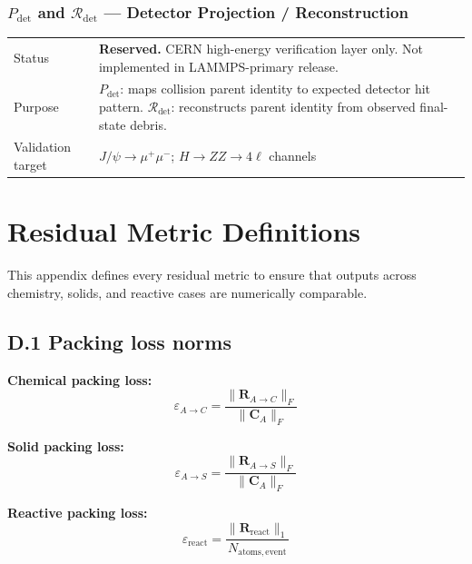 \documentclass[11pt, a4paper, oneside]{article}
\newcommand{\Comp}[1]{\mathbf{C}_{#1}}
\newcommand{\Resid}[1]{\mathbf{R}_{#1}}
\begin{document}
\begin{appendices}
\vspace{1em}

\subsubsection*{$P_{\mathrm{det}}$ and $\mathcal{R}_{\mathrm{det}}$ --- Detector Projection / Reconstruction}

\begin{tabularx}{\linewidth}{l X}
  \toprule
  Status & \textbf{Reserved.} CERN high-energy verification layer only.
	Not implemented in LAMMPS-primary release. \\
  Purpose & $P_{\mathrm{det}}$: maps collision parent identity to
	expected detector hit pattern.
	$\mathcal{R}_{\mathrm{det}}$: reconstructs parent identity
	from observed final-state debris. \\
  Validation target & $J/\psi \to \mu^+\mu^-$;
	$H \to ZZ \to 4\ell$ channels \\
  \bottomrule
\end{tabularx}

\section{Residual Metric Definitions}
\label{app:D}

This appendix defines every residual metric to ensure that outputs across
chemistry, solids, and reactive cases are numerically comparable.

\subsection*{D.1 Packing loss norms}

\textbf{Chemical packing loss:}
\begin{equation}
  \varepsilon_{A \to C}
  = \frac{\|\Resid{A \to C}\|_F}{\|\Comp{A}\|_F}
  \tag{D.1}
\end{equation}

\textbf{Solid packing loss:}
\begin{equation}
  \varepsilon_{A \to S}
  = \frac{\|\Resid{A \to S}\|_F}{\|\Comp{A}\|_F}
  \tag{D.2}
\end{equation}

\textbf{Reactive packing loss:}
\begin{equation}
  \varepsilon_{\mathrm{react}}
  = \frac{\|\Resid{\mathrm{react}}\|_1}{N_{\mathrm{atoms,event}}}
  \tag{D.3}
\end{equation}


\end{appendices}
\end{document}
